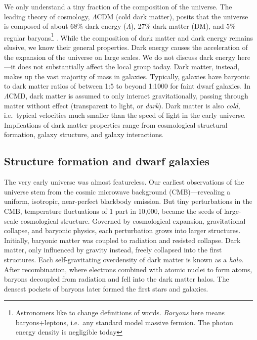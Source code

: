 We only understand a tiny fraction of the composition of the universe.
The leading theory of cosmology, \(\Lambda\)CDM (cold dark matter),
posits that the universe is composed of about 68\% dark energy
(\(\Lambda\)), 27\% dark matter (DM), and 5\% regular baryons\footnote{Astronomers
  like to change definitions of words. \emph{Baryons} here means
  baryons+leptons, i.e.~any standard model massive fermion. The photon
  energy density is negligible today} \citep{planckcollaboration+2020}.
While the composition of dark matter and dark energy remains elusive, we
know their general properties. Dark energy causes the acceleration of
the expansion of the universe on large scales. We do not discuss dark
energy here---it does not substantially affect the local group today.
Dark matter, instead, makes up the vast majority of mass in galaxies.
Typically, galaxies have baryonic to dark matter ratios of between 1:5
to beyond 1:1000 for faint dwarf galaxies. In \(\Lambda\)CMD, dark
matter is assumed to only interact gravitationally, passing through
matter without effect (transparent to light, or \emph{dark}). Dark
matter is also \emph{cold}, i.e.~typical velocities much smaller than
the speed of light in the early universe. Implications of dark matter
properties range from cosmological structural formation, galaxy
structure, and galaxy interactions.

\subsection{Structure formation and dwarf
galaxies}\label{structure-formation-and-dwarf-galaxies}

The very early universe was almost featureless. Our earliest
observations of the universe stem from the cosmic microwave background
(CMB)---revealing a uniform, isotropic, near-perfect blackbody emission.
But tiny perturbations in the CMB, temperature fluctuations of 1 part in
10,000, became the seeds of large-scale cosmological structure. Governed
by cosmological expansion, gravitational collapse, and baryonic physics,
each perturbation grows into larger structures. Initially, baryonic
matter was coupled to radiation and resisted collapse. Dark matter, only
influenced by gravity instead, freely collapsed into the first
structures. Each self-gravitating overdensity of dark matter is known as
a \emph{halo}. After recombination, where electrons combined with atomic
nuclei to form atoms, baryons decoupled from radiation and fell into the
dark matter halos. The densest pockets of baryons later formed the first
stars and galaxies.

